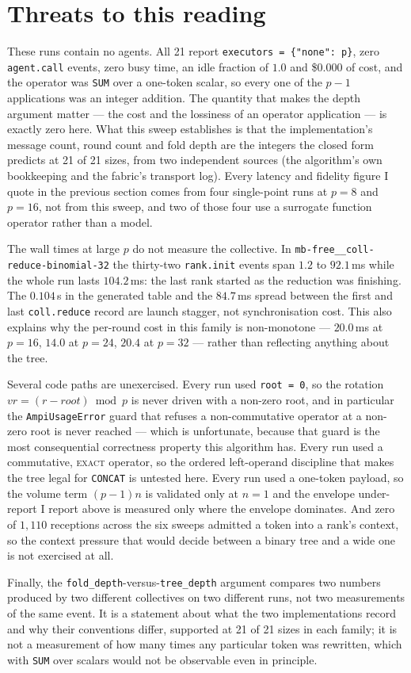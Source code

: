 \documentclass[11pt]{article}
\begin{document}
\section{Threats to this reading}

These runs contain no agents. All 21 report \texttt{executors = \{"none": p\}}, zero
\texttt{agent.call} events, zero busy time, an idle fraction of $1.0$ and \$0.000 of cost, and
the operator was \texttt{SUM} over a one-token scalar, so every one of the $p-1$ applications
was an integer addition. The quantity that makes the depth argument matter --- the cost and the
lossiness of an operator application --- is exactly zero here. What this sweep establishes is
that the implementation's message count, round count and fold depth are the integers the closed
form predicts at 21 of 21 sizes, from two independent sources (the algorithm's own bookkeeping
and the fabric's transport log). Every latency and fidelity figure I quote in the previous
section comes from four single-point runs at $p=8$ and $p=16$, not from this sweep, and two of
those four use a surrogate function operator rather than a model.

The wall times at large $p$ do not measure the collective. In
\texttt{mb-free\_\_coll-reduce-binomial-32} the thirty-two \texttt{rank.init} events span $1.2$
to $92.1$\,ms while the whole run lasts $104.2$\,ms: the last rank started as the reduction was
finishing. The $0.104$\,s in the generated table and the $84.7$\,ms spread between the first and
last \texttt{coll.reduce} record are launch stagger, not synchronisation cost. This also
explains why the per-round cost in this family is non-monotone --- $20.0$\,ms at $p=16$,
$14.0$ at $p=24$, $20.4$ at $p=32$ --- rather than reflecting anything about the tree.

Several code paths are unexercised. Every run used \texttt{root = 0}, so the rotation
$vr = (r - \mathit{root}) \bmod p$ is never driven with a non-zero root, and in particular the
\texttt{AmpiUsageError} guard that refuses a non-commutative operator at a non-zero root is
never reached --- which is unfortunate, because that guard is the most consequential
correctness property this algorithm has. Every run used a commutative, \textsc{exact} operator,
so the ordered left-operand discipline that makes the tree legal for \texttt{CONCAT} is
untested here. Every run used a one-token payload, so the volume term $(p-1)n$ is validated only
at $n=1$ and the envelope under-report I report above is measured only where the envelope
dominates. And zero of $1{,}110$ receptions across the six sweeps admitted a token into a rank's
context, so the context pressure that would decide between a binary tree and a wide one is not
exercised at all.

Finally, the \texttt{fold\_depth}-versus-\texttt{tree\_depth} argument compares two numbers
produced by two different collectives on two different runs, not two measurements of the same
event. It is a statement about what the two implementations record and why their conventions
differ, supported at 21 of 21 sizes in each family; it is not a measurement of how many times
any particular token was rewritten, which with \texttt{SUM} over scalars would not be
observable even in principle.
\end{document}
